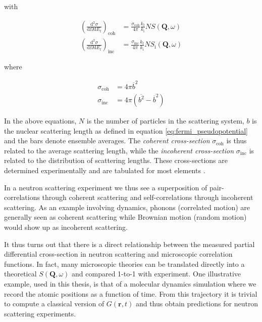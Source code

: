 \noindent with

\begin{align*}
	\left( \frac{\mathrm{d}^2\sigma}{\mathrm{d}\Omega\mathrm{d}E_\text{f}} \right)_\text{coh} &= \frac{\sigma_\text{coh}}{4\pi}\frac{k_\text{f}}{k_\text{i}}N S(\bm{Q}, \omega) \\ 
	\left( \frac{\mathrm{d}^2\sigma}{\mathrm{d}\Omega\mathrm{d}E_\text{f}} \right)_\text{inc} &= \frac{\sigma_\text{inc}}{4\pi}\frac{k_\text{f}}{k_\text{i}}N S_\text{i}(\bm{Q}, \omega)
\end{align*}

\noindent where

\begin{align*}
	\sigma_\text{coh} &= 4 \pi \overline{b}^2 \\
	\sigma_\text{inc} &= 4 \pi \left( \overline{b^2} - \overline{b}^2 \right)
\end{align*}

\noindent In the above equations, $N$ is the number of particles in the scattering system, $b$ is the nuclear scattering length as defined in equation \eqref{eq:fermi_pseudopotential} and the bars denote ensemble averages. The \emph{coherent cross-section} $\sigma_\text{coh}$ is thus related to the average scattering length, while the \emph{incoherent cross-section} $\sigma_\text{inc}$ is related to the distribution of scattering lengths. These cross-sections are determined experimentally and are tabulated for most elements \cite{nist}.

In a neutron scattering experiment we thus see a superposition of pair-correlations through coherent scattering and self-correlations through incoherent scattering. As an example involving dynamics, phonons (correlated motion) are generally seen as coherent scattering while Brownian motion (random motion) would show up as incoherent scattering.

It thus turns out that there is a direct relationship between the measured partial differential cross-section in neutron scattering and microscopic correlation functions. In fact, many microscopic theories can be translated directly into a theoretical $S(\bm{Q}, \omega)$ and compared 1-to-1 with experiment. One illustrative example, used in this thesis, is that of a molecular dynamics simulation where we record the atomic positions as a function of time. From this trajectory it is trivial to compute a classical version of $G(\bm{r},t)$ and thus obtain predictions for neutron scattering experiments.

